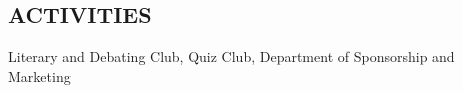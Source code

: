\documentclass[margin]{res}
\begin{document}
\begin{resume}
\section{ACTIVITIES}
                Literary and Debating Club, Quiz Club, Department of Sponsorship and Marketing
                

 
 
\end{resume} 
\end{document}
